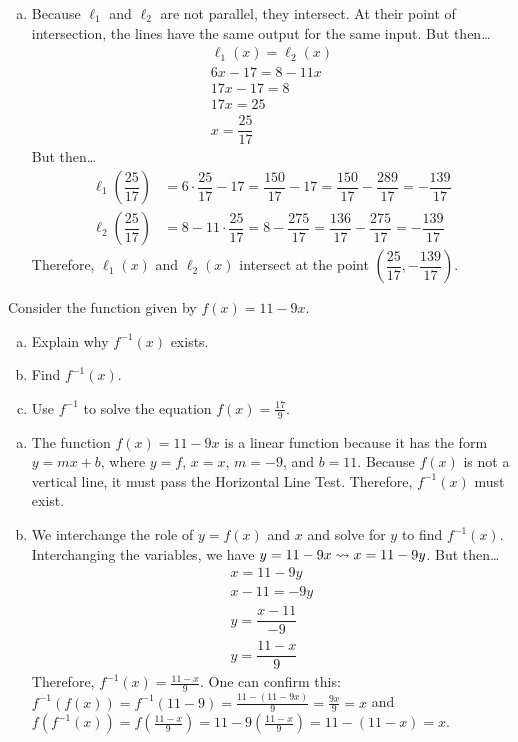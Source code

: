 \documentclass[12pt,letterpaper]{exam}
\begin{document}
\begin{questions}
\begin{enumerate}[(a)]
\item Because $\ell_1$ and $\ell_2$ are not parallel, they intersect. At their point of intersection, the lines have the same output for the same input. But then\dots
	\[
	\begin{gathered}
	\ell_1(x)= \ell_2(x) \\
	6x - 17= 8 - 11x \\
	17x - 17= 8 \\
	17x= 25 \\
	x= \dfrac{25}{17}
	\end{gathered}
	\]
But then\dots
	\[
	\begin{aligned}
	\ell_1 \left( \dfrac{25}{17} \right)&= 6 \cdot \dfrac{25}{17} - 17= \dfrac{150}{17} - 17= \dfrac{150}{17} - \dfrac{289}{17}= -\dfrac{139}{17} \\[0.3cm]
	\ell_2 \left( \dfrac{25}{17} \right)&= 8 - 11 \cdot \dfrac{25}{17}= 8 - \dfrac{275}{17}= \dfrac{136}{17} - \dfrac{275}{17}= -\dfrac{139}{17}
	\end{aligned}
	\]
Therefore, $\ell_1(x)$ and $\ell_2(x)$ intersect at the point $\left( \dfrac{25}{17}, -\dfrac{139}{17} \right)$. 
\end{enumerate}



\newpage
\question[10] Consider the function given by $f(x)= 11 - 9x$.
	\begin{enumerate}[(a)]
	\item Explain why $f^{-1}(x)$ exists. 
	\item Find $f^{-1}(x)$.
	\item Use $f^{-1}$ to solve the equation $f(x)= \frac{17}{9}$. 
	\end{enumerate} \pspace

\sol 
\begin{enumerate}[(a)]
\item The function $f(x)= 11 - 9x$ is a linear function because it has the form $y= mx + b$, where $y= f$, $x= x$, $m= -9$, and $b= 11$. Because $f(x)$ is not a vertical line, it must pass the Horizontal Line Test. Therefore, $f^{-1}(x)$ must exist. \pspace

\item We interchange the role of $y= f(x)$ and $x$ and solve for $y$ to find $f^{-1}(x)$. Interchanging the variables, we have $y= 11 - 9x \rightsquigarrow x= 11 - 9y$. But then\dots
	\[
	\begin{gathered}
	x= 11 - 9y \\
	x - 11= -9y \\
	y= \dfrac{x - 11}{-9} \\
	y= \dfrac{11 - x}{9}
	\end{gathered}
	\]
Therefore, $f^{-1}(x)= \frac{11 - x}{9}$. One can confirm this: $f^{-1}(f(x))= f^{-1}(11 - 9)= \frac{11 - (11 - 9x)}{9}= \frac{9x}{9}= x$ and $f(f^{-1}(x))= f(\frac{11 - x}{9})= 11 - 9(\frac{11 - x}{9})= 11 - (11 - x)= x$. \pspace


\end{enumerate}
\end{questions}
\end{document}
